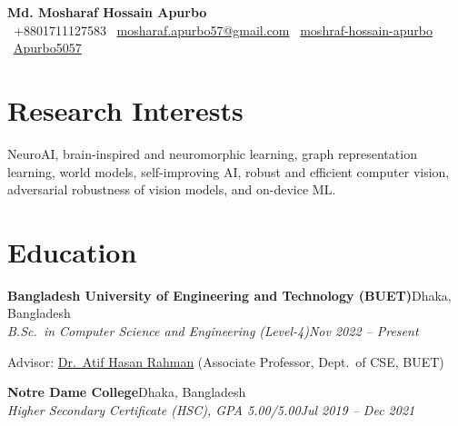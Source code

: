 \documentclass[10pt,a4paper]{article}
\newcommand{\blink}[2]{\href{#1}{\textcolor{linkblue}{#2}}}
\newcommand{\entry}[4]{%
  \textbf{#1}\hfill #2\\
  \textit{#3}\hfill\textit{#4}\par\vspace{1pt}}
\begin{document}
 
\begin{center}
  {\LARGE\textbf{Md. Mosharaf Hossain Apurbo}}\\[4pt]
  \small
  \faPhone*\ +8801711127583\quad
  \faEnvelope\ \blink{mailto:mosharaf.apurbo57@gmail.com}{mosharaf.apurbo57@gmail.com}\quad
  \faLinkedin\ \blink{https://www.linkedin.com/in/m-a-hossain-884aa52a0/}{moshraf-hossain-apurbo}\quad
  \faGithub\ \blink{https://github.com/Apurbo5057}{Apurbo5057}
\end{center}
\vspace{-6pt}
 
\section{Research Interests}
NeuroAI, brain-inspired and neuromorphic learning, graph representation learning, world models, self-improving AI, robust and efficient computer vision, adversarial robustness of vision models, and on-device ML.
 
\section{Education}
\entry{Bangladesh University of Engineering and Technology (BUET)}{Dhaka, Bangladesh}
      {B.Sc.\ in Computer Science and Engineering (Level-4)}{Nov 2022 -- Present}
Advisor: \blink{https://cse.buet.ac.bd/faculty/faculty_detail/atif}{Dr.\ Atif Hasan Rahman} (Associate Professor, Dept.\ of CSE, BUET)


\vspace{2pt}
\entry{Notre Dame College}{Dhaka, Bangladesh}
      {Higher Secondary Certificate (HSC), GPA 5.00/5.00}{Jul 2019 -- Dec 2021}
 
\end{document}

